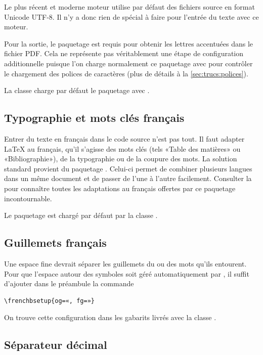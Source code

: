 {Le plus récent et moderne moteur {\XeTeX} utilise par défaut des
fichiers source en format Unicode UTF-8. Il n'y a donc rien de spécial
à faire pour l'entrée du texte avec ce moteur.

Pour la sortie, le paquetage  \citep{fontspec} est
requis pour obtenir les lettres accentuées dans le fichier PDF. Cela ne
représente pas véritablement une étape de configuration additionnelle
puisque l'on charge normalement ce paquetage avec {\XeLaTeX} pour
contrôler le chargement des polices de caractères (plus de détails à
la \autoref{sec:trucs:polices}).

La classe  charge par défaut le paquetage
 avec {\XeLaTeX}.

\subsection{Typographie et mots clés français}
\label{sec:bases:francais:babel}

Entrer du texte en français dans le code source n'est pas tout. Il
faut adapter {\LaTeX} au français, qu'il s'agisse des mots clés (tels
«Table des matières» ou «Bibliographie»), de la typographie ou de la
coupure des mots. La solution standard provient du paquetage
 \citep{babel}. Celui-ci permet de combiner plusieurs
langues dans un même document et de passer de l'une à l'autre
facilement. Consulter la %
pour connaître toutes les adaptations au français offertes par ce
paquetage incontournable.

Le paquetage  est chargé par défaut par la classe
.

\subsection{Guillemets français}
\label{sec:bases:francais:guillemets}

Une espace fine devrait séparer les guillemets du ou des mots qu'ils
entourent. Pour que l'espace autour des symboles soit géré
automatiquement par , il suffit d'ajouter dans le préambule
la commande
\begin{lstlisting}
\frenchbsetup{og=«, fg=»}
\end{lstlisting}
On trouve cette configuration dans les gabarits livrés avec la classe
.

\subsection{Séparateur décimal}
\label{sec:bases:francais:virgule}

}
